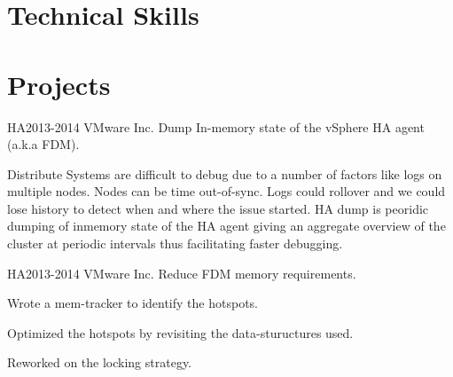\documentclass[10pt]{article} %
\begin{document}

\section{Technical Skills}


\section{Projects}

\project
{HA}{2013-2014}
{VMware Inc.}
{Dump In-memory state of the vSphere HA agent (a.k.a FDM).}
{\begin{itemize-noindent}
\item{Distribute Systems are difficult to debug due to a number of factors
like logs on multiple nodes. Nodes can be time out-of-sync. Logs could
rollover and we could lose history to detect when and where the issue 
started. HA dump is peoridic dumping of inmemory state of the HA agent
giving an aggregate overview of the cluster at periodic intervals thus
facilitating faster debugging.}
\end{itemize-noindent}}

\project
{HA}{2013-2014}
{VMware Inc.}
{Reduce FDM memory requirements.}
{\begin{itemize-noindent}
\item{Wrote a mem-tracker to identify the hotspots.}
\item{Optimized the hotspots by revisiting the data-stuructures used.}
\item{Reworked on the locking strategy.}
\end{itemize-noindent}}
\end{document}
